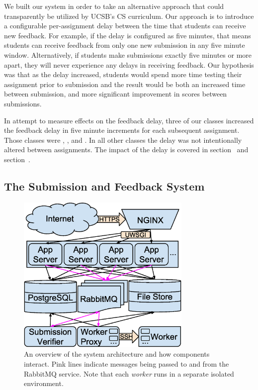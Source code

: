 We built our system in order to take an alternative approach that could
transparently be utilized by UCSB's CS curriculum. Our approach is to introduce
a configurable per-assignment delay between the time that students can receive
new feedback. For example, if the delay is configured as five minutes, that
means students can receive feedback from only one new submission in any five
minute window. Alternatively, if students make submissions exactly five minutes
or more apart, they will never experience any delays in receiving feedback. Our
hypothesis was that as the delay increased, students would spend more time
testing their assignment prior to submission and the result would be both an
increased time between submission, and more significant improvement in scores
between submissions.

In attempt to measure effects on the feedback delay, three of our classes
increased the feedback delay in five minute increments for each subsequent
assignment. Those classes were , , and . In
all other classes the delay was not intentionally altered between
assignments. The impact of the delay is covered in
section~ and section~.


\subsection{The Submission and Feedback System}

\begin{figure}[!t]
\centering \includegraphics[width=3.3in]{graphs/architecture.eps}
\caption{An overview of the system architecture and how components
  interact. Pink lines indicate messages being passed to and from the RabbitMQ
  service. Note that each \emph{worker} runs in a separate isolated
  environment.}
\end{figure}

